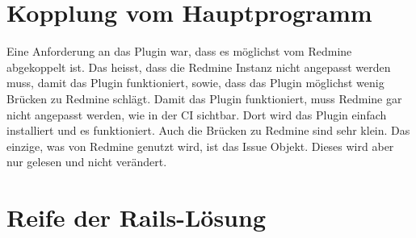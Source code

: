 \section{Kopplung vom Hauptprogramm}
Eine Anforderung an das Plugin war, dass es möglichst vom Redmine abgekoppelt ist. Das heisst, dass die
Redmine Instanz nicht angepasst werden muss, damit das Plugin funktioniert, sowie, dass das Plugin möglichst
wenig Brücken zu Redmine schlägt. \newline
Damit das Plugin funktioniert, muss Redmine gar nicht angepasst werden, wie in der CI sichtbar. Dort wird
das Plugin einfach installiert und es funktioniert. Auch die Brücken zu Redmine sind sehr klein. Das einzige,
was von Redmine genutzt wird, ist das Issue Objekt. Dieses wird aber nur gelesen und nicht verändert.

\section{Reife der Rails-Lösung}
